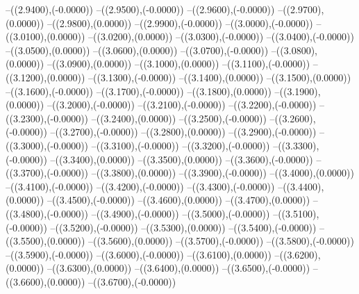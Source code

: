 {	--({\sx*(2.9400)},{\sy*(-0.0000)})
	--({\sx*(2.9500)},{\sy*(-0.0000)})
	--({\sx*(2.9600)},{\sy*(-0.0000)})
	--({\sx*(2.9700)},{\sy*(0.0000)})
	--({\sx*(2.9800)},{\sy*(0.0000)})
	--({\sx*(2.9900)},{\sy*(-0.0000)})
	--({\sx*(3.0000)},{\sy*(-0.0000)})
	--({\sx*(3.0100)},{\sy*(0.0000)})
	--({\sx*(3.0200)},{\sy*(0.0000)})
	--({\sx*(3.0300)},{\sy*(-0.0000)})
	--({\sx*(3.0400)},{\sy*(-0.0000)})
	--({\sx*(3.0500)},{\sy*(0.0000)})
	--({\sx*(3.0600)},{\sy*(0.0000)})
	--({\sx*(3.0700)},{\sy*(-0.0000)})
	--({\sx*(3.0800)},{\sy*(0.0000)})
	--({\sx*(3.0900)},{\sy*(0.0000)})
	--({\sx*(3.1000)},{\sy*(0.0000)})
	--({\sx*(3.1100)},{\sy*(-0.0000)})
	--({\sx*(3.1200)},{\sy*(0.0000)})
	--({\sx*(3.1300)},{\sy*(-0.0000)})
	--({\sx*(3.1400)},{\sy*(0.0000)})
	--({\sx*(3.1500)},{\sy*(0.0000)})
	--({\sx*(3.1600)},{\sy*(-0.0000)})
	--({\sx*(3.1700)},{\sy*(-0.0000)})
	--({\sx*(3.1800)},{\sy*(0.0000)})
	--({\sx*(3.1900)},{\sy*(0.0000)})
	--({\sx*(3.2000)},{\sy*(-0.0000)})
	--({\sx*(3.2100)},{\sy*(-0.0000)})
	--({\sx*(3.2200)},{\sy*(-0.0000)})
	--({\sx*(3.2300)},{\sy*(-0.0000)})
	--({\sx*(3.2400)},{\sy*(0.0000)})
	--({\sx*(3.2500)},{\sy*(-0.0000)})
	--({\sx*(3.2600)},{\sy*(-0.0000)})
	--({\sx*(3.2700)},{\sy*(-0.0000)})
	--({\sx*(3.2800)},{\sy*(0.0000)})
	--({\sx*(3.2900)},{\sy*(-0.0000)})
	--({\sx*(3.3000)},{\sy*(-0.0000)})
	--({\sx*(3.3100)},{\sy*(-0.0000)})
	--({\sx*(3.3200)},{\sy*(-0.0000)})
	--({\sx*(3.3300)},{\sy*(-0.0000)})
	--({\sx*(3.3400)},{\sy*(0.0000)})
	--({\sx*(3.3500)},{\sy*(0.0000)})
	--({\sx*(3.3600)},{\sy*(-0.0000)})
	--({\sx*(3.3700)},{\sy*(-0.0000)})
	--({\sx*(3.3800)},{\sy*(0.0000)})
	--({\sx*(3.3900)},{\sy*(-0.0000)})
	--({\sx*(3.4000)},{\sy*(0.0000)})
	--({\sx*(3.4100)},{\sy*(-0.0000)})
	--({\sx*(3.4200)},{\sy*(-0.0000)})
	--({\sx*(3.4300)},{\sy*(-0.0000)})
	--({\sx*(3.4400)},{\sy*(0.0000)})
	--({\sx*(3.4500)},{\sy*(-0.0000)})
	--({\sx*(3.4600)},{\sy*(0.0000)})
	--({\sx*(3.4700)},{\sy*(0.0000)})
	--({\sx*(3.4800)},{\sy*(-0.0000)})
	--({\sx*(3.4900)},{\sy*(-0.0000)})
	--({\sx*(3.5000)},{\sy*(-0.0000)})
	--({\sx*(3.5100)},{\sy*(-0.0000)})
	--({\sx*(3.5200)},{\sy*(-0.0000)})
	--({\sx*(3.5300)},{\sy*(0.0000)})
	--({\sx*(3.5400)},{\sy*(-0.0000)})
	--({\sx*(3.5500)},{\sy*(0.0000)})
	--({\sx*(3.5600)},{\sy*(0.0000)})
	--({\sx*(3.5700)},{\sy*(-0.0000)})
	--({\sx*(3.5800)},{\sy*(-0.0000)})
	--({\sx*(3.5900)},{\sy*(-0.0000)})
	--({\sx*(3.6000)},{\sy*(-0.0000)})
	--({\sx*(3.6100)},{\sy*(0.0000)})
	--({\sx*(3.6200)},{\sy*(0.0000)})
	--({\sx*(3.6300)},{\sy*(0.0000)})
	--({\sx*(3.6400)},{\sy*(0.0000)})
	--({\sx*(3.6500)},{\sy*(-0.0000)})
	--({\sx*(3.6600)},{\sy*(0.0000)})
	--({\sx*(3.6700)},{\sy*(-0.0000)})
}
